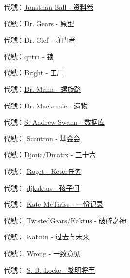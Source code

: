 
\hr

\begin{scpboxbrc}

代號：\hyperref[chap:SCP-001.sheaf.of.papers]{Jonathan Ball - 资料卷}

代號：\hyperref[chap:SCP-001.the.prototype]{Dr. Gears - 原型}

代號：\hyperref[chap:SCP-001.the.gate.guardian]{Dr. Clef - 守门者}

代號：\hyperref[chap:SCP-001.the.lock]{qntm - 锁}

代號：\hyperref[chap:SCP-001.the.factory]{Bright - 工厂}

代號：\hyperref[chap:SCP-001.the.spiral.path]{Dr. Mann - 螺旋路}

代號：\hyperref[chap:SCP-001.the.legacy]{Dr. Mackenzie - 遗物}

代號：\hyperref[chap:SCP-001.the.database]{S. Andrew Swann - 数据库}

代號：\hyperref[chap:SCP-001.the.foundation]{ Scantron - 基金会}

代號：\hyperref[chap:SCP-001.thirty.six]{Djoric/Dmatix - 三十六}

代號： \hyperref[chap:SCP-001.keter.duty]{Roget - Keter任务}

代號： \hyperref[chap:SCP-001.the.children]{djkaktus - 孩子们}

代號： \hyperref[chap:SCP-001.a.record]{Kate McTiriss - 一份记录}

代號： \hyperref[chap:SCP-001.the.broken.god]{TwistedGears/Kaktus - 破碎之神}

代號： \hyperref[chap:SCP-001.past.and.future]{Kalinin - 过去与未来}

代號： \hyperref[chap:SCP-001.the.consensus]{Wrong - 一致意见}

代號： \hyperref[chap:SCP-001.when.day.breaks]{S. D. Locke - 黎明将至}

\end{scpboxbrc}
